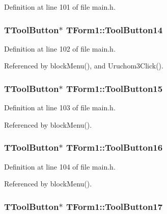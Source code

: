 Definition at line 101 of file main.h.\hypertarget{classTForm1_7f5544c0484108b05d7804d18e537032}{
\subsubsection[ToolButton14]{\setlength{\rightskip}{0pt plus 5cm}TToolButton$\ast$ {\bf TForm1::ToolButton14}}}
\label{classTForm1_7f5544c0484108b05d7804d18e537032}




Definition at line 102 of file main.h.

Referenced by blockMenu(), and Uruchom3Click().\hypertarget{classTForm1_640f6c6b44c7b4e93f800ddf9415240d}{
\subsubsection[ToolButton15]{\setlength{\rightskip}{0pt plus 5cm}TToolButton$\ast$ {\bf TForm1::ToolButton15}}}
\label{classTForm1_640f6c6b44c7b4e93f800ddf9415240d}




Definition at line 103 of file main.h.

Referenced by blockMenu().\hypertarget{classTForm1_a6f360b14445883aedb8f6ad892dc27f}{
\subsubsection[ToolButton16]{\setlength{\rightskip}{0pt plus 5cm}TToolButton$\ast$ {\bf TForm1::ToolButton16}}}
\label{classTForm1_a6f360b14445883aedb8f6ad892dc27f}




Definition at line 104 of file main.h.

Referenced by blockMenu().\hypertarget{classTForm1_6d324e1cf8b3d25388e8444bb17cca3f}{
\subsubsection[ToolButton17]{\setlength{\rightskip}{0pt plus 5cm}TToolButton$\ast$ {\bf TForm1::ToolButton17}}}
\label{classTForm1_6d324e1cf8b3d25388e8444bb17cca3f}




